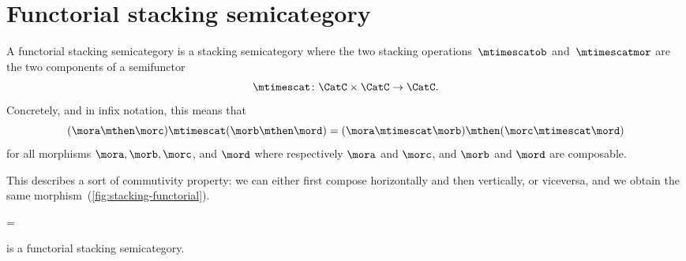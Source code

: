 \section{Functorial stacking semicategory}

\begin{ctdefinition}
    \label{def:functorial-stacking-semi-cat}
    A functorial stacking semicategory is a stacking semicategory where the two stacking operations~$\mtimescatob$ and~$\mtimescatmor$ are the two components of a semifunctor
    \begin{equation}
        \mtimescat\colon \CatC \times \CatC \to \CatC.
    \end{equation}
    Concretely, and in infix notation, this means that
    \begin{equation}
        (\mora \mthen \morc ) \mtimescat (\morb \mthen \mord )
        =
        (\mora \mtimescat \morb )
        \mthen (\morc \mtimescat \mord )
    \end{equation}
    for all morphisms $\mora, \morb, \morc$, and $\mord$ where respectively $\mora$ and $\morc$, and $\morb$ and $\mord$ are composable.
\end{ctdefinition}

%
This describes a sort of commutivity property: we can either first compose horizontally and then vertically, or viceversa, and we obtain the same morphism~(\cref{fig:stacking-functorial}).

\begin{figure*}[h]
    \centering
    =
    \caption{Commutation of stacking and composition in a functorial stacking semicategory. }
    \label{fig:stacking-functorial}
\end{figure*}

\begin{lemma}
    \SetL is a functorial stacking semicategory.
\end{lemma}

